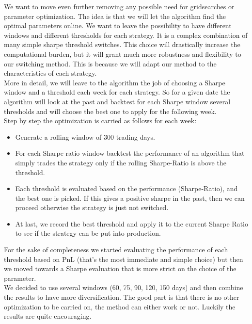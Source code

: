 We want to move even further removing any possible need for gridsearches or parameter optimization. The idea is that we will let the algorithm find the optimal parameters online. We want to leave the possibility to have different windows and different thresholds for each strategy. It is a complex combination of many simple sharpe threshold switches. This choice will drastically increase the computational burden, but it will grant much more robustness and flexibility to our switching method. This is because we will adapt our method to the characteristics of each strategy.\\
More in detail, we will leave to the algorithm the job of choosing a Sharpe window and a threshold each week for each strategy. So for a given date the algorithm will look at the past and backtest for each Sharpe window several thresholds and will choose the best one to apply for the following week.\\
Step by step the optimization is carried as follows for each week:
\begin{itemize}
	\item Generate a rolling window of 300 trading days.
	\item For each Sharpe-ratio window backtest the performance of an algorithm that simply trades the strategy only if the rolling Sharpe-Ratio is above the threshold.
	\item Each threshold is evaluated based on the performance (Sharpe-Ratio), and the best one is picked. If this gives a positive sharpe in the past, then we can proceed otherwise the strategy is just not switched.
	\item At last, we record the best threshold and apply it to the current Sharpe Ratio to see if the strategy can be put into production.
\end{itemize}

For the sake of completeness we started evaluating the performance of each threshold based on PnL (that's the most immediate and simple choice) but then we moved towards a Sharpe evaluation that is more strict on the choice of the parameter.\\
We decided to use several windows (60, 75, 90, 120, 150 days) and then combine the results to have more diversification. The good part is that there is no other optimization to be carried on, the method can either work or not. Luckily the results are quite encouraging.

